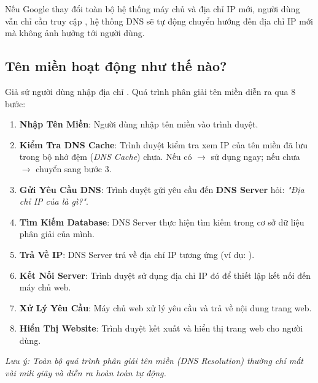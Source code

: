 \begin{tipBox}
Nếu Google thay đổi toàn bộ hệ thống máy chủ và địa chỉ IP mới, người dùng vẫn chỉ cần truy cập , hệ thống DNS sẽ tự động chuyển hướng đến địa chỉ IP mới mà không ảnh hưởng tới người dùng.
\end{tipBox}

\subsection{Tên miền hoạt động như thế nào?}

Giả sử người dùng nhập địa chỉ . Quá trình phân giải tên miền diễn ra qua 8 bước:

\begin{conceptBox}
\begin{enumerate}[label=\textbf{\color{conceptBorder}Bước \arabic*:}, leftmargin=4.8em, itemsep=3pt, parsep=0pt, topsep=4pt]
    \item \textbf{Nhập Tên Miền}: Người dùng nhập tên miền vào trình duyệt.
    \item \textbf{Kiểm Tra DNS Cache}: Trình duyệt kiểm tra xem IP của tên miền đã lưu trong bộ nhớ đệm (\textit{DNS Cache}) chưa. Nếu có $\rightarrow$ sử dụng ngay; nếu chưa $\rightarrow$ chuyển sang bước 3.
    \item \textbf{Gửi Yêu Cầu DNS}: Trình duyệt gửi yêu cầu đến \textbf{DNS Server} hỏi: \textit{"Địa chỉ IP của  là gì?"}.
    \item \textbf{Tìm Kiếm Database}: DNS Server thực hiện tìm kiếm trong cơ sở dữ liệu phân giải của mình.
    \item \textbf{Trả Về IP}: DNS Server trả về địa chỉ IP tương ứng (ví dụ: ).
    \item \textbf{Kết Nối Server}: Trình duyệt sử dụng địa chỉ IP đó để thiết lập kết nối đến máy chủ web.
    \item \textbf{Xử Lý Yêu Cầu}: Máy chủ web xử lý yêu cầu và trả về nội dung trang web.
    \item \textbf{Hiển Thị Website}: Trình duyệt kết xuất và hiển thị trang web cho người dùng.
\end{enumerate}
\end{conceptBox}
\textit{Lưu ý: Toàn bộ quá trình phân giải tên miền (DNS Resolution) thường chỉ mất vài mili giây và diễn ra hoàn toàn tự động.}

